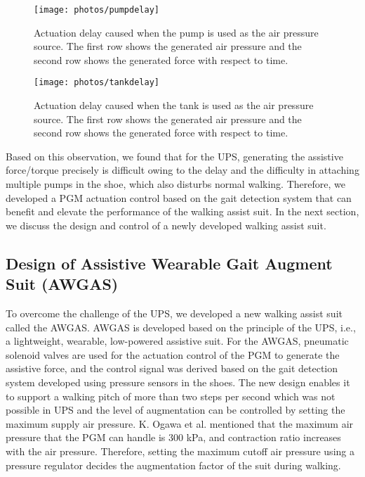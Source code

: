 \documentclass[paper,JRM,paper]{jaciiiarticle}
\begin{document}
\begin{figure}[h]
	\centering
	\texttt{[image: photos/pumpdelay]}
	\caption{Actuation delay caused when the pump is used as the air pressure source. The first row shows the generated air pressure and the second row shows the generated force with respect to time.}
	\label{fig:pump}
\end{figure}

\begin{figure}
	\centering
	\texttt{[image: photos/tankdelay]}
	\caption{Actuation delay caused when the tank is used as the air pressure source. The first row shows the generated air pressure and the second row shows the generated force with respect to time.}
	\label{fig:tank}
\end{figure}

Based on this observation, we found that for the UPS, generating the assistive force/torque precisely is difficult owing to the delay and the difficulty in attaching multiple pumps in the shoe, which also disturbs normal walking. Therefore, we developed a PGM actuation control based on the gait detection system that can benefit and elevate the performance of the walking assist suit. In the next section, we discuss the design and control of a newly developed walking assist suit.

\subsection{Design of Assistive Wearable Gait Augment Suit (AWGAS)}
To overcome the challenge of the UPS, we developed a new walking assist suit called the AWGAS. AWGAS is developed based on the principle of the UPS, i.e., a lightweight, wearable, low-powered assistive suit. For the AWGAS, pneumatic solenoid valves are used for the actuation control of the PGM to generate the assistive force, and the control signal was derived based on the gait detection system developed using pressure sensors in the shoes. The new design enables it to support a walking pitch of more than two steps per second which was not possible in UPS\cite{11} and the level of augmentation can be controlled by setting the maximum supply air pressure.  K. Ogawa et al. mentioned that the maximum air pressure that the PGM can handle is 300 kPa, and contraction ratio increases with the air pressure. Therefore, setting the maximum cutoff air pressure using a pressure regulator decides the augmentation factor of the suit during walking. 
\end{document}
